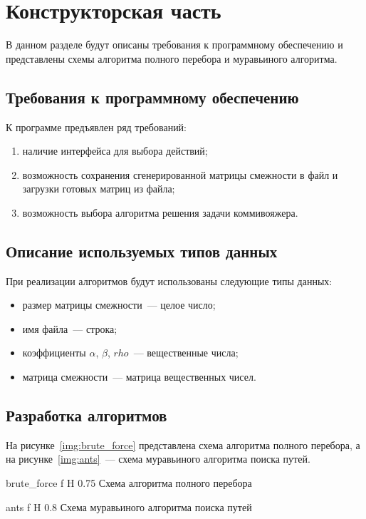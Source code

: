 \chapter{Конструкторская часть}

В данном разделе будут описаны требования к программному обеспечению и представлены схемы алгоритма полного перебора и муравьиного алгоритма.

\section{Требования к программному обеспечению}

К программе предъявлен ряд требований:
\begin{enumerate}
	\item наличие интерфейса для выбора действий;
	\item возможность сохранения сгенерированной матрицы смежности в файл и загрузки готовых матриц из файла;
	\item возможность выбора алгоритма решения задачи коммивояжера. 
\end{enumerate}

\section{Описание используемых типов данных}

При реализации алгоритмов будут использованы следующие типы данных:
\begin{itemize}
	\item размер матрицы смежности~--- целое число;
	\item имя файла~--- строка;
	\item коэффициенты $\alpha$, $\beta$, $rho$~--- вещественные числа;
	\item матрица смежности~--- матрица вещественных чисел.
\end{itemize}

\section{Разработка алгоритмов}

На рисунке~\ref{img:brute_force} представлена схема алгоритма полного перебора, а на рисунке~\ref{img:ants}~--- схема муравьиного алгоритма поиска путей.

{brute_force}
{f}
{H}
{0.75\textwidth}
{Схема алгоритма полного перебора}

{ants}
{f}
{H}
{0.8\textwidth}
{Схема муравьиного алгоритма поиска путей}

